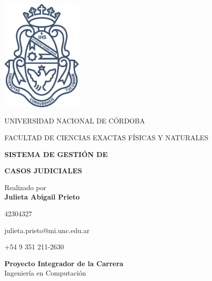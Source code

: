 \begin{center}

\includegraphics[width=0.3\textwidth]{fig/logoUNC.png}

\vspace*{1cm}
\begin{large}
UNIVERSIDAD NACIONAL DE CÓRDOBA 

FACULTAD DE CIENCIAS EXACTAS FÍSICAS Y NATURALES
\end{large}


\vspace*{0.1in}
\AddToShipoutPictureBG*{\AtPageLowerLeft{%
  \color{US_red!20}\rule{.25\paperwidth}{\paperheight}}}

{\fontsize{24}{28}\selectfont\textbf{SISTEMA DE GESTIÓN DE}}

{\fontsize{24}{28}\selectfont\textbf{CASOS JUDICIALES}}

\vspace*{.2in}

{\large Realizado por}\\
\textbf{\Large Julieta Abigail Prieto}\\
\vspace*{0.15in}

\begin{description}\centering
    \item[\large Matrícula] \large 42304327
    \item[\large Mail] \large julieta.prieto@mi.unc.edu.ar
    \item[\large Contacto] \large +54 9 351 211-2630
\end{description}


\vspace*{1cm}
\begin{mdframed}[style=US_style]
\centering
\textbf{Proyecto Integrador de la Carrera}\\
{\large Ingeniería en Computación} 


\end{mdframed}
\end{center}
